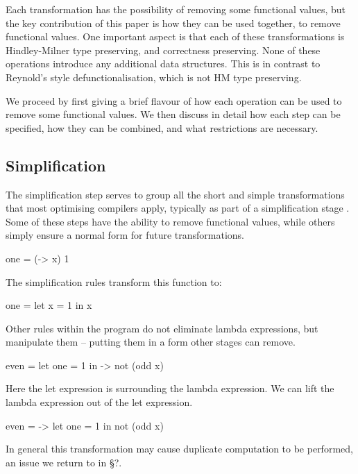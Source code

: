 \documentclass[preprint]{sigplanconf}
\begin{document}
Each transformation has the possibility of removing some functional values, but the key contribution of this paper is how they can be used together, to remove functional values. One important aspect is that each of these transformations is Hindley-Milner type preserving, and correctness preserving. None of these operations introduce any additional data structures. This is in contrast to Reynold's style defunctionalisation, which is not HM type preserving.

We proceed by first giving a brief flavour of how each operation can be used to remove some functional values. We then discuss in detail how each step can be specified, how they can be combined, and what restrictions are necessary.

\subsection{Simplification}

The simplification step serves to group all the short and simple transformations that most optimising compilers apply, typically as part of a simplification stage \cite{ghc_simplifier}. Some of these steps have the ability to remove functional values, while others simply ensure a normal form for future transformations.

\begin{example}
\begin{code}
one = (\x -> x) 1
\end{code}

The simplification rules transform this function to:

\begin{code}
one = let x = 1 in x
\end{code}
\end{example}

Other rules within the program do not eliminate lambda expressions, but manipulate them -- putting them in a form other stages can remove.

\begin{example}
\begin{code}
even = let one = 1 in \x -> not (odd x)
\end{code}

Here the let expression is surrounding the lambda expression. We can lift the lambda expression out of the let expression.

\begin{code}
even = \x -> let one = 1 in not (odd x)
\end{code}

In general this transformation may cause duplicate computation to be performed, an issue we return to in \S?.
\end{example}
\end{document}
